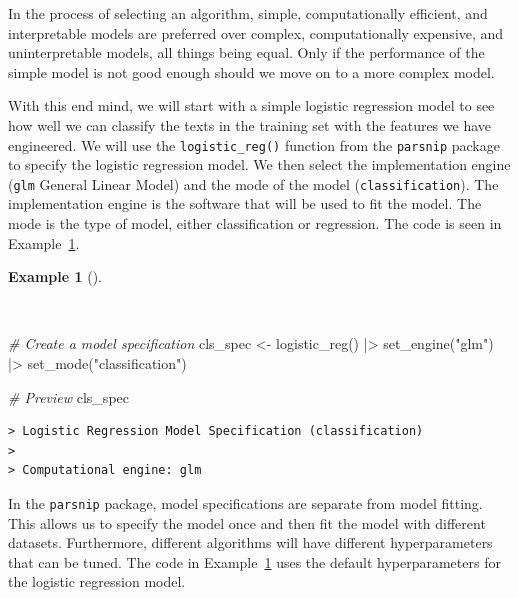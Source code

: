 \documentclass[
  letterpaper,
  DIV=11,
  numbers=noendperiod]{scrreprt}
\newenvironment{Shaded}{\begin{snugshade}}{\end{snugshade}}
\newcommand{\CommentTok}[1]{\textcolor[rgb]{0.00,0.00,0.00}{\textit{#1}}}
\newcommand{\FunctionTok}[1]{\textcolor[rgb]{0.00,0.00,0.00}{#1}}
\newcommand{\NormalTok}[1]{\textcolor[rgb]{0.00,0.00,0.00}{#1}}
\newcommand{\OtherTok}[1]{\textcolor[rgb]{0.00,0.00,0.00}{#1}}
\newcommand{\SpecialCharTok}[1]{\textcolor[rgb]{0.00,0.00,0.00}{#1}}
\newcommand{\StringTok}[1]{\textcolor[rgb]{0.00,0.00,0.00}{#1}}
\theoremstyle{definition}
\newtheorem{example}{Example}[chapter]
\theoremstyle{remark}
\begin{document}
In the process of selecting an algorithm, simple, computationally
efficient, and interpretable models are preferred over complex,
computationally expensive, and uninterpretable models, all things being
equal. Only if the performance of the simple model is not good enough
should we move on to a more complex model.

With this end mind, we will start with a simple logistic regression
model to see how well we can classify the texts in the training set with
the features we have engineered. We will use the
\texttt{logistic\_reg()} function from the \texttt{parsnip} package to
specify the logistic regression model. We then select the implementation
engine (\texttt{glm} General Linear Model) and the mode of the model
(\texttt{classification}). The implementation engine is the software
that will be used to fit the model. The mode is the type of model,
either classification or regression. The code is seen in
Example~\ref{exm-pda-class-model-spec}.

\begin{example}[]\protect\hypertarget{exm-pda-class-model-spec}{}\label{exm-pda-class-model-spec}

~

\begin{Shaded}
\begin{Highlighting}[]
\CommentTok{\# Create a model specification}
\NormalTok{cls\_spec }\OtherTok{\textless{}{-}}
  \FunctionTok{logistic\_reg}\NormalTok{() }\SpecialCharTok{|\textgreater{}}
  \FunctionTok{set\_engine}\NormalTok{(}\StringTok{"glm"}\NormalTok{) }\SpecialCharTok{|\textgreater{}}
  \FunctionTok{set\_mode}\NormalTok{(}\StringTok{"classification"}\NormalTok{)}

\CommentTok{\# Preview}
\NormalTok{cls\_spec}
\end{Highlighting}
\end{Shaded}

\begin{verbatim}
> Logistic Regression Model Specification (classification)
> 
> Computational engine: glm
\end{verbatim}

\end{example}

In the \texttt{parsnip} package, model specifications are separate from
model fitting. This allows us to specify the model once and then fit the
model with different datasets. Furthermore, different algorithms will
have different hyperparameters that can be tuned. The code in
Example~\ref{exm-pda-class-model-spec} uses the default hyperparameters
for the logistic regression model.
\end{document}
